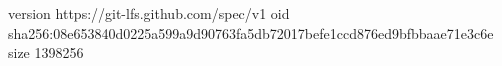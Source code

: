 version https://git-lfs.github.com/spec/v1
oid sha256:08e653840d0225a599a9d90763fa5db72017befe1ccd876ed9bfbbaae71e3c6e
size 1398256
